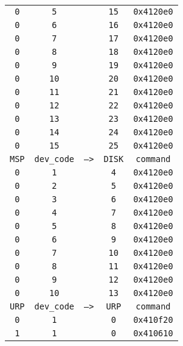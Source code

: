 \begin{adjustwidth}{5ex}{1ex}
\begin{tabular}{ccccc}
		\texttt{0} & \texttt{5} & & \texttt{15} & \texttt{0x4120e0} \\
		\texttt{0} & \texttt{6} & & \texttt{16} & \texttt{0x4120e0} \\
		\texttt{0} & \texttt{7} & & \texttt{17} & \texttt{0x4120e0} \\
		\texttt{0} & \texttt{8} & & \texttt{18} & \texttt{0x4120e0} \\
		\texttt{0} & \texttt{9} & & \texttt{19} & \texttt{0x4120e0} \\
		\texttt{0} & \texttt{10} & & \texttt{20} & \texttt{0x4120e0} \\
		\texttt{0} & \texttt{11} & & \texttt{21} & \texttt{0x4120e0} \\
		\texttt{0} & \texttt{12} & & \texttt{22} & \texttt{0x4120e0} \\
		\texttt{0} & \texttt{13} & & \texttt{23} & \texttt{0x4120e0} \\
		\texttt{0} & \texttt{14} & & \texttt{24} & \texttt{0x4120e0} \\
		\texttt{0} & \texttt{15} & & \texttt{25} & \texttt{0x4120e0} \\
		\texttt{MSP} & \texttt{dev\_code} & \texttt{-->} & \texttt{DISK} & \texttt{command} \\
		\texttt{0} & \texttt{1} & & \texttt{4} & \texttt{0x4120e0} \\
		\texttt{0} & \texttt{2} & & \texttt{5} & \texttt{0x4120e0} \\
		\texttt{0} & \texttt{3} & & \texttt{6} & \texttt{0x4120e0} \\
		\texttt{0} & \texttt{4} & & \texttt{7} & \texttt{0x4120e0} \\
		\texttt{0} & \texttt{5} & & \texttt{8} & \texttt{0x4120e0} \\
		\texttt{0} & \texttt{6} & & \texttt{9} & \texttt{0x4120e0} \\
		\texttt{0} & \texttt{7} & & \texttt{10} & \texttt{0x4120e0} \\
		\texttt{0} & \texttt{8} & & \texttt{11} & \texttt{0x4120e0} \\
		\texttt{0} & \texttt{9} & & \texttt{12} & \texttt{0x4120e0} \\
		\texttt{0} & \texttt{10} & & \texttt{13} & \texttt{0x4120e0} \\
		\texttt{URP} & \texttt{dev\_code} & \texttt{-->} & \texttt{URP} & \texttt{command} \\
		\texttt{0} & \texttt{1} & & \texttt{0} & \texttt{0x410f20} \\
		\texttt{1} & \texttt{1} & & \texttt{0} & \texttt{0x410610} \\

\end{tabular}
\end{adjustwidth}
